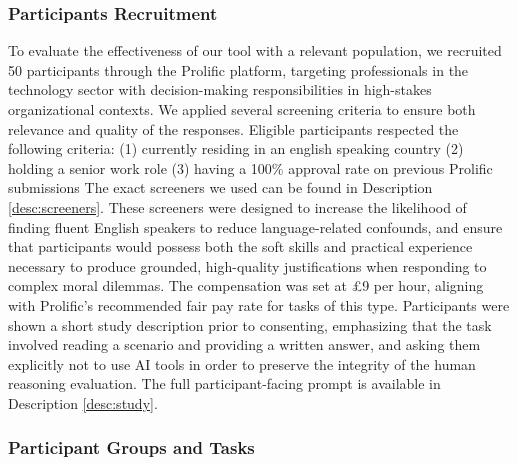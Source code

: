 \subsubsection{Participants Recruitment}

To evaluate the effectiveness of our tool with a relevant population, we recruited 50 participants through the Prolific platform, targeting professionals in the technology sector with decision-making responsibilities in high-stakes organizational contexts.
We applied several screening criteria to ensure both relevance and quality of the responses. Eligible participants respected the following criteria:
(1) currently residing in an english speaking country
(2) holding a senior work role
(3) having a 100\% approval rate on previous Prolific submissions
The exact screeners we used can be found in Description \ref{desc:screeners}.
These screeners were designed to increase the likelihood of finding fluent English speakers to reduce language-related confounds, and ensure that participants would possess both the soft skills and practical experience necessary to produce grounded, high-quality justifications when responding to complex moral dilemmas.
The compensation was set at £9 per hour, aligning with Prolific's recommended fair pay rate for tasks of this type.
Participants were shown a short study description prior to consenting, emphasizing that the task involved reading a scenario and providing a written answer, and asking them explicitly not to use AI tools in order to preserve the integrity of the human reasoning evaluation. The full participant-facing prompt is available in Description \ref{desc:study}.

\subsubsection{Participant Groups and Tasks}

